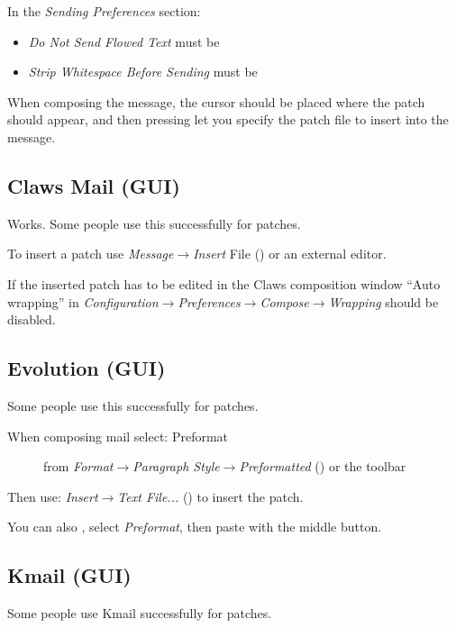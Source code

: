 \documentclass[a4paper,8pt,english]{sphinxmanual}
\begin{document}
In the \emph{Sending Preferences} section:
\begin{itemize}
\item {} 
\emph{Do Not Send Flowed Text} must be 

\item {} 
\emph{Strip Whitespace Before Sending} must be 

\end{itemize}

When composing the message, the cursor should be placed where the patch
should appear, and then pressing  let you specify the patch file
to insert into the message.


\subsection{Claws Mail (GUI)}
\label{process/email-clients:claws-mail-gui}
Works. Some people use this successfully for patches.

To insert a patch use \emph{Message\(\rightarrow\)Insert} File ()
or an external editor.

If the inserted patch has to be edited in the Claws composition window
``Auto wrapping'' in
\emph{Configuration\(\rightarrow\)Preferences\(\rightarrow\)Compose\(\rightarrow\)Wrapping} should be
disabled.


\subsection{Evolution (GUI)}
\label{process/email-clients:evolution-gui}
Some people use this successfully for patches.
\begin{description}
\item[{When composing mail select: Preformat}] \leavevmode
from \emph{Format\(\rightarrow\)Paragraph Style\(\rightarrow\)Preformatted} ()
or the toolbar

\end{description}

Then use:
\emph{Insert\(\rightarrow\)Text File...} ()
to insert the patch.

You can also , select
\emph{Preformat}, then paste with the middle button.


\subsection{Kmail (GUI)}
\label{process/email-clients:kmail-gui}
Some people use Kmail successfully for patches.
\end{document}

